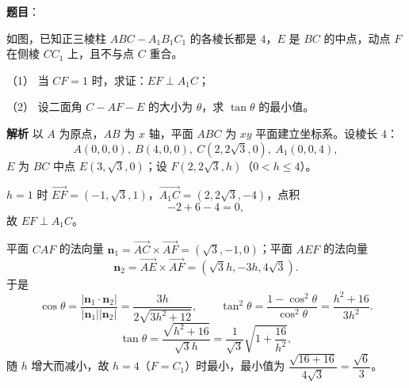 \begin{answer}

\textbf{题目}：

如图，已知正三棱柱 $ABC-A_1B_1C_1$ 的各棱长都是 $4$，$E$ 是 $BC$ 的中点，动点 $F$ 在侧棱 $CC_1$ 上，且不与点 $C$ 重合。

（1） 当 $CF=1$ 时，求证：$EF\perp A_1C$；

（2） 设二面角 $C-AF-E$ 的大小为 $\theta$，求 $\tan\theta$ 的最小值。
\nopagebreak[4]
\begin{center}\end{center}
\nopagebreak[4]
\textbf{解析}
以 $A$ 为原点，$AB$ 为 $x$ 轴，平面 $ABC$ 为 $xy$ 平面建立坐标系。设棱长 $4$：
\nopagebreak[4]
\[A(0,0,0),\ B(4,0,0),\ C(2,2\sqrt3,0),\ A_1(0,0,4),\]
$E$ 为 $BC$ 中点 $E(3,\sqrt3,0)$；设 $F(2,2\sqrt3,h)$（$0<h\leqslant4$）。

$h=1$ 时 $\overrightarrow{EF}=(-1,\sqrt3,1)$，$\overrightarrow{A_1C}=(2,2\sqrt3,-4)$，点积
\nopagebreak[4]
\[-2+6-4=0,\]
故 $EF\perp A_1C$。

平面 $CAF$ 的法向量 $\boldsymbol n_1=\overrightarrow{AC}\times\overrightarrow{AF}=(\sqrt3,-1,0)$；平面 $AEF$ 的法向量
\nopagebreak[4]
\[\boldsymbol n_2=\overrightarrow{AE}\times\overrightarrow{AF}=(\sqrt3h,-3h,4\sqrt3).\]
于是
\nopagebreak[4]
\[\cos\theta=\frac{|\boldsymbol n_1\cdot\boldsymbol n_2|}{|\boldsymbol n_1||\boldsymbol n_2|}
=\frac{3h}{2\sqrt{3h^2+12}},\qquad
\tan^2\theta=\frac{1-\cos^2\theta}{\cos^2\theta}=\frac{h^2+16}{3h^2}.\]
\nopagebreak[4]
\[\tan\theta=\frac{\sqrt{h^2+16}}{\sqrt3h}=\frac1{\sqrt3}\sqrt{1+\frac{16}{h^2}},\]
随 $h$ 增大而减小，故 $h=4$（$F=C_1$）时最小，最小值为 $\dfrac{\sqrt{16+16}}{4\sqrt3}=\dfrac{\sqrt6}3$。



\end{answer}
